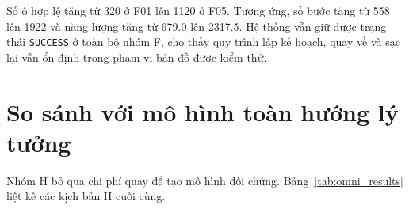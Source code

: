 \documentclass[../DoAn.tex]{subfiles}
\begin{document}
\begin{table}[H]
\centering
\caption{Kết quả nhóm F khi tăng kích thước bản đồ}
\label{tab:scale_results}
\scriptsize
\setlength{\tabcolsep}{3.5pt}
\renewcommand{\arraystretch}{1.08}
\end{table}

Số ô hợp lệ tăng từ 320 ở F01 lên 1120 ở F05. Tương ứng, số bước tăng từ 558 lên 1922 và năng lượng tăng từ 679.0 lên 2317.5. Hệ thống vẫn giữ được trạng thái \texttt{SUCCESS} ở toàn bộ nhóm F, cho thấy quy trình lập kế hoạch, quay về và sạc lại vẫn ổn định trong phạm vi bản đồ được kiểm thử.

\section{So sánh với mô hình toàn hướng lý tưởng}

Nhóm H bỏ qua chi phí quay để tạo mô hình đối chứng. Bảng~\ref{tab:omni_results} liệt kê các kịch bản H cuối cùng.
\end{document}
